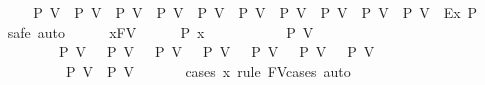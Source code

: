 \begin{isabellebody}
\isanewline
\ \ \isamarkupfalse%
\isanewline
\ \ \isamarkupfalse%
\ {\isachardoublequoteopen}{\isacharparenleft}{\kern0pt}P\ V{}\ {\isasymor}\ P\ V{}\ {\isasymor}\ P\ V{}\ {\isasymor}\ P\ V{}\ {\isasymor}\ P\ V{}\ {\isasymor}\ P\ V{}\ {\isasymor}\ P\ V{}\ {\isasymor}\ P\ V{}\ {\isasymor}\ P\ V{}\ {\isasymor}\ P\ V{}{}{\isacharparenright}{\kern0pt}\ {\isacharequal}{\kern0pt}\ Ex\ P{\isachardoublequoteclose}\isanewline
\ \ \isamarkupfalse%
{\isacharparenleft}{\kern0pt}safe{\isacharcomma}{\kern0pt}\ auto{\isacharparenright}{\kern0pt}\isanewline
\ \ \ \ \isamarkupfalse%
\ x{\isacharcolon}{\kern0pt}{\isacharcolon}{\kern0pt}FV\isanewline
\ \ \ \ \isamarkupfalse%
\ {\isachardoublequoteopen}P\ x\ {\isasymLongrightarrow}\isanewline
\ \ \ \ \ \ \ \ \ {\isasymnot}\ P\ V{}\ {\isasymLongrightarrow}\isanewline
\ \ \ \ \ \ \ \ \ {\isasymnot}\ P\ V{}\ {\isasymLongrightarrow}\ {\isasymnot}\ P\ V{}\ {\isasymLongrightarrow}\ {\isasymnot}\ P\ V{}\ {\isasymLongrightarrow}\ {\isasymnot}\ P\ V{}\ {\isasymLongrightarrow}\ {\isasymnot}\ P\ V{}\ {\isasymLongrightarrow}\ {\isasymnot}\ P\ V{}\ {\isasymLongrightarrow}\ {\isasymnot}\ P\ V{}\ {\isasymLongrightarrow}\ \isanewline
\ \ \ \ \ \ \ \ \ \ {\isasymnot}\ P\ V{}{}\ {\isasymLongrightarrow}\ P\ V{}\ {\isachardoublequoteclose}\ \isanewline
\ \ \ \ \isamarkupfalse%
{\isacharparenleft}{\kern0pt}cases\ x\ rule{\isacharcolon}{\kern0pt}\ FV{\isacharunderscore}{\kern0pt}cases{\isacharcomma}{\kern0pt}\ auto{\isacharparenright}{\kern0pt}\ \isamarkupfalse%
\isanewline
\ \ \isamarkupfalse%
\isanewline
{}\isamarkupfalse%
%
\endisatagproof
{\isafoldproof}%
%
\isadelimproof
\isanewline
%
\endisadelimproof
\isanewline
{}\isamarkupfalse%
\ \isanewline
\isanewline
{}\isamarkupfalse%
\ \isanewline
{}\isanewline
%
\isadelimproof
\ \ %
\endisadelimproof
%
\isatagproof
{}\isamarkupfalse%

\end{isabellebody}
